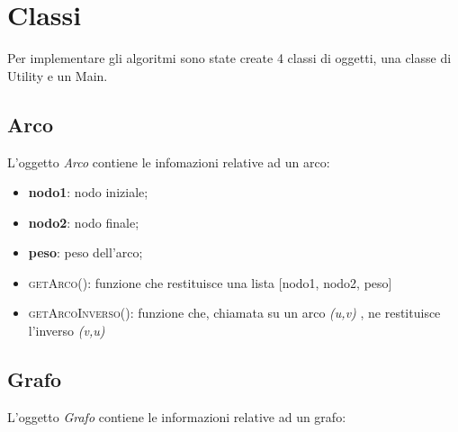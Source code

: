 \section{Classi}
\label{Classi}

Per implementare gli algoritmi sono state create 4 classi di oggetti, una classe di Utility e un Main.

\subsection{Arco}
\label{Arco}

L'oggetto \textit{Arco} contiene le infomazioni relative ad un arco:

\begin{itemize}
    \item \textbf{nodo1}: nodo iniziale;
    \item \textbf{nodo2}: nodo finale;
    \item \textbf{peso}: peso dell'arco;
    \item \textsc{getArco()}: funzione che restituisce una lista [nodo1, nodo2, peso]
    \item \textsc{getArcoInverso()}: funzione che, chiamata su un arco \emph{(u,v)} , ne restituisce l'inverso \emph{(v,u)}
\end{itemize}

\subsection{Grafo}
\label{Grafo}

L'oggetto \textit{Grafo} contiene le informazioni relative ad un grafo:

